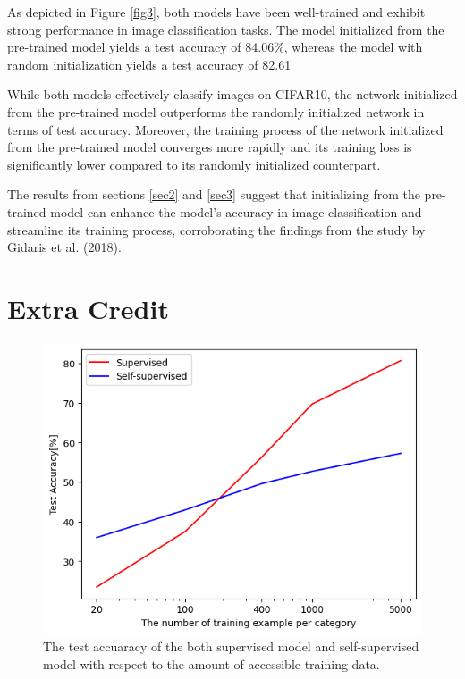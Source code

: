 \documentclass[10pt]{article}
\begin{document}
As depicted in Figure \ref{fig3}, both models have been well-trained and exhibit strong performance in image classification tasks. The model initialized from the pre-trained model yields a test accuracy of 84.06\%, whereas the model with random initialization yields a test accuracy of 82.61%

While both models effectively classify images on CIFAR10, the network initialized from the pre-trained model outperforms the randomly initialized network in terms of test accuracy. Moreover, the training process of the network initialized from the pre-trained model converges more rapidly and its training loss is significantly lower compared to its randomly initialized counterpart.

The results from sections \ref{sec2} and \ref{sec3} suggest that initializing from the pre-trained model can enhance the model's accuracy in image classification and streamline its training process, corroborating the findings from the study by Gidaris et al. (2018)\cite{Gidaris2018}.
\section*{Extra Credit}
\begin{figure}[!h]
    \begin{center}
        \includegraphics[scale = 0.4]{"fig/extracredit.png"}
    \end{center}
    \caption{The test accuaracy of the both supervised model and self-supervised model with respect to the amount of accessible training data. }
    \label{fig4}
\end{figure}
\end{document}
